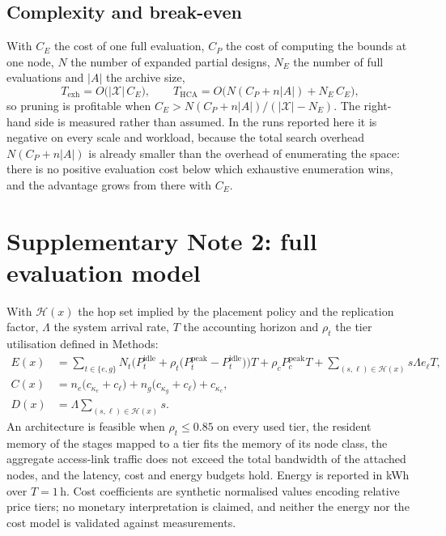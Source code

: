 \documentclass[pdflatex,sn-nature]{sn-jnl}
\newcommand{\X}{\mathcal{X}}
\theoremstyle{thmstyleone}
\theoremstyle{thmstyletwo}
\theoremstyle{thmstylethree}
\begin{document}
\subsection{Complexity and break-even}
With $C_E$ the cost of one full evaluation, $C_P$ the cost of computing the bounds at one
node, $N$ the number of expanded partial designs, $N_E$ the number of full evaluations
and $|A|$ the archive size,
\begin{equation}
T_{\mathrm{exh}}=O\big(|\X|\,C_E\big),\qquad
T_{\mathrm{HCA}}=O\big(N(C_P+n|A|)+N_E\,C_E\big),
\end{equation}
so pruning is profitable when $C_E>N(C_P+n|A|)/(|\X|-N_E)$. The right-hand side is
measured rather than assumed. In the runs reported here it is negative on every scale and
workload, because the total search overhead $N(C_P+n|A|)$ is already smaller than the
overhead of enumerating the space: there is no positive evaluation cost below which
exhaustive enumeration wins, and the advantage grows from there with $C_E$.

\section{Supplementary Note 2: full evaluation model}\label{snote2}

With $\mathcal{H}(x)$ the hop set implied by the placement policy and the replication
factor, $\Lambda$ the system arrival rate, $T$ the accounting horizon and $\rho_t$ the
tier utilisation defined in Methods:
\begin{align}
E(x) &= \sum_{t\in\{e,g\}} N_t\Big(P^{\mathrm{idle}}_t+\rho_t\big(P^{\mathrm{peak}}_t-
        P^{\mathrm{idle}}_t\big)\Big)T
      + \rho_c P^{\mathrm{peak}}_c T
      + \sum_{(s,\ell)\in\mathcal{H}(x)} s\Lambda e_\ell T, \\
C(x) &= n_e\big(c_{\kappa_e}+c_\ell\big)+n_g\big(c_{\kappa_g}+c_\ell\big)+c_{\kappa_c}, \\
D(x) &= \Lambda \sum_{(s,\ell)\in\mathcal{H}(x)} s .
\end{align}
An architecture is feasible when $\rho_t\le0.85$ on every used tier, the resident memory
of the stages mapped to a tier fits the memory of its node class, the aggregate
access-link traffic does not exceed the total bandwidth of the attached nodes, and the
latency, cost and energy budgets hold. Energy is reported in kWh over $T=1$\,h. Cost
coefficients are synthetic normalised values encoding relative price tiers; no monetary
interpretation is claimed, and neither the energy nor the cost model is validated against
measurements.
\end{document}
